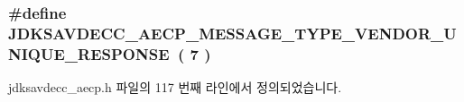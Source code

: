 \subsubsection[{\texorpdfstring{J\+D\+K\+S\+A\+V\+D\+E\+C\+C\+\_\+\+A\+E\+C\+P\+\_\+\+M\+E\+S\+S\+A\+G\+E\+\_\+\+T\+Y\+P\+E\+\_\+\+V\+E\+N\+D\+O\+R\+\_\+\+U\+N\+I\+Q\+U\+E\+\_\+\+R\+E\+S\+P\+O\+N\+SE}{JDKSAVDECC_AECP_MESSAGE_TYPE_VENDOR_UNIQUE_RESPONSE}}]{\setlength{\rightskip}{0pt plus 5cm}\#define J\+D\+K\+S\+A\+V\+D\+E\+C\+C\+\_\+\+A\+E\+C\+P\+\_\+\+M\+E\+S\+S\+A\+G\+E\+\_\+\+T\+Y\+P\+E\+\_\+\+V\+E\+N\+D\+O\+R\+\_\+\+U\+N\+I\+Q\+U\+E\+\_\+\+R\+E\+S\+P\+O\+N\+SE~( 7 )}\hypertarget{group__aecp__message__type_ga0ae19013f80cab20e33bdc804b7f1364}{}\label{group__aecp__message__type_ga0ae19013f80cab20e33bdc804b7f1364}


jdksavdecc\+\_\+aecp.\+h 파일의 117 번째 라인에서 정의되었습니다.

